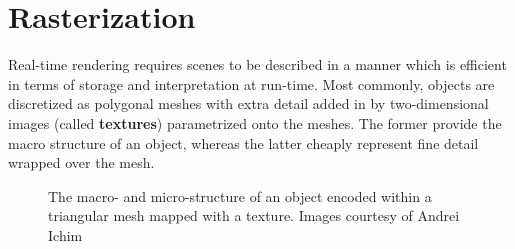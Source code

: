 \section{Rasterization}

Real-time rendering requires scenes to be described in a manner which is efficient in terms of storage and interpretation at run-time. Most commonly, objects are discretized as polygonal meshes with extra detail added in by two-dimensional images (called \textbf{textures}) parametrized onto the meshes. The former provide the macro structure of an object, whereas the latter cheaply represent fine detail wrapped over the mesh.

\begin{figure}[h!]
  \centering
  \caption{The macro- and micro-structure of an object encoded within a triangular mesh mapped with a texture. Images courtesy of Andrei Ichim}
  \label{fig:PostApCar}
\end{figure}

